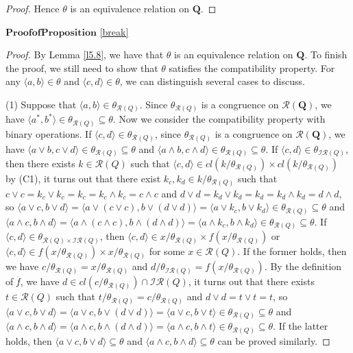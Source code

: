 \documentclass[12pt]{amsart}
\theoremstyle{definition}
\theoremstyle{remark}
\numberwithin{equation}{section}
\begin{document}
\begin{proof}
Hence $\theta$ is an equivalence relation on $\mathbf{Q}$.
\end{proof}



\noindent $\mathbf{Proof of Proposition}$ \ref{break}
\begin{proof} By Lemma \ref{l5.8}, we have that $\theta$ is an equivalence relation on $\mathbf{Q}$. To finish the proof, we still need to show that $\theta$ satisfies the compatibility property. For any $\langle a,b\rangle\in \theta$ and $\langle c,d\rangle\in \theta$, we can distinguish several cases to discuss.

(1) Suppose that $\langle a,b\rangle\in \theta_{\mathscr{R}(Q)}$. Since $\theta_{\mathscr{R}(Q)}$ is a congruence on $\mathscr{R}(\mathbf{Q})$, we have $\langle a^{\ast},b^{\ast}\rangle\in \theta_{\mathscr{R}(Q)}\subseteq \theta$. Now we consider the compatibility property with binary operations.
If $\langle c,d\rangle\in \theta_{\mathscr{R}(Q)}$, since $\theta_{\mathscr{R}(Q)}$ is a congruence on $\mathscr{R}(\mathbf{Q})$, we have $\langle a\vee b,c \vee d\rangle\in \theta_{\mathscr{R}(Q)}\subseteq \theta$ and $\langle a\wedge b,c \wedge d\rangle\in \theta_{\mathscr{R}(Q)}\subseteq \theta$.  If $\langle c,d\rangle\in \theta_{\mathscr{IR}(Q)}$, then there exists $k\in \mathscr{R}(Q)$ such that $\langle c,d\rangle\in cl(k/\theta_{\mathscr{R}(Q)})\times cl(k/\theta_{\mathscr{R}(Q)})$ by (C1), it turns out that there exist $k_{c},k_{d}\in k/\theta_{\mathscr{R}(Q)}$ such that $c\vee c=k_{c}\vee k_{c}=k_{c}=k_{c}\wedge k_{c}=c\wedge c$ and $d\vee d=k_{d}\vee k_{d}=k_{d}=k_{d}\wedge k_{d}=d\wedge d$, so $\langle a\vee c,b \vee d\rangle=\langle a\vee (c\vee c),b \vee (d\vee d)\rangle=\langle a\vee k_{c},b \vee k_{d}\rangle\in \theta_{\mathscr{R}(Q)}\subseteq \theta$ and $\langle a\wedge c,b \wedge d\rangle=\langle a\wedge (c\wedge c),b \wedge (d\wedge d)\rangle=\langle a\wedge k_{c},b \wedge k_{d}\rangle\in \theta_{\mathscr{R}(Q)}\subseteq \theta$. If $\langle c,d\rangle\in \theta_{\mathscr{R}(Q)\times \mathscr{IR}(Q)}$, then $\langle c,d\rangle\in x/\theta_{\mathscr{R}(Q)}\times f(x/\theta_{\mathscr{R}(Q)})$ or
$\langle c,d\rangle\in f(x/\theta_{\mathscr{R}(Q)})\times x/\theta_{\mathscr{R}(Q)}$ for some $x\in \mathscr{R}(Q)$. If the former holds,
then we have $c/\theta_{\mathscr{R}(Q)}=x/\theta_{\mathscr{R}(Q)}$ and $d/\theta_{\mathscr{IR}(Q)}=f(x/\theta_{\mathscr{R}(Q)})$.
By the definition of $\emph{f}$, we have $d\in cl(c/\theta_{\mathscr{R}(Q)})\cap \mathscr{IR}(Q)$, it turns out that there exists $t\in \mathscr{R}(Q)$ such that $t/\theta_{\mathscr{R}(Q)}= c/\theta_{\mathscr{R}(Q)}$ and $d\vee d=t\vee t=t$, so $\langle a\vee c,b\vee d\rangle=\langle a\vee c,b\vee (d\vee d)\rangle=\langle a\vee c,b\vee t\rangle\in \theta_{\mathscr{R}(Q)}\subseteq \theta$ and $\langle a\wedge c, b \wedge d\rangle=\langle a\wedge c, b\wedge (d\wedge d)\rangle=\langle a\wedge c, b\wedge t\rangle \in \theta_{\mathscr{R}(Q)}\subseteq \theta$.
If the latter holds, then $\langle a\vee c,b\vee d\rangle\subseteq \theta$ and $\langle a\wedge c,b\wedge d\rangle\subseteq \theta$ can be proved similarly.


\end{proof}
\end{document}
